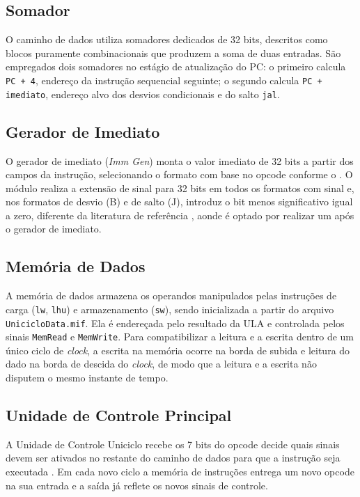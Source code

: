 \documentclass[conference]{IEEEtran}
\begin{document}
\subsection{Somador}
O caminho de dados utiliza somadores dedicados de 32 bits, descritos como blocos puramente combinacionais
que produzem a soma de duas entradas. São empregados dois somadores no estágio de atualização do PC: o
primeiro calcula \texttt{PC + 4}, endereço da instrução sequencial seguinte; o segundo calcula
\texttt{PC + imediato}, endereço alvo dos desvios condicionais e do salto
\texttt{jal}.

\subsection{Gerador de Imediato}
O gerador de imediato (\textit{Imm Gen}) monta o valor imediato de 32 bits a partir dos campos da
instrução, selecionando o formato com base no opcode conforme o \cite{referenceGuide}. 
O módulo realiza a extensão de sinal para 32 bits em todos os formatos com sinal e,
nos formatos de desvio (B) e de salto (J), introduz o bit menos significativo igual a zero, diferente da
literatura de referência \cite{patterson2020computer}, aonde é optado por realizar um 
após o gerador de imediato.

\subsection{Memória de Dados}
A memória de dados armazena os operandos manipulados pelas instruções de carga (\texttt{lw}, \texttt{lhu})
e armazenamento (\texttt{sw}), sendo inicializada a partir do arquivo \texttt{UnicicloData.mif}. Ela é
endereçada pelo resultado da ULA e controlada pelos sinais \texttt{MemRead} e \texttt{MemWrite}. 
Para compatibilizar a leitura e a escrita dentro de um único ciclo de \textit{clock}, a escrita na memória ocorre na
borda de subida e leitura do dado na borda de descida do \textit{clock}, de modo que a leitura e
a escrita não disputem o mesmo instante de tempo.

\subsection{Unidade de Controle Principal}
A Unidade de Controle Uniciclo recebe os 7 bits do opcode decide quais sinais devem ser ativados no 
restante do caminho de dados para que a instrução seja executada \cite{patterson2020computer}. 
Em cada novo ciclo a memória de instruções
entrega um novo opcode na sua entrada e a saída já reflete os novos sinais de controle.
\end{document}
